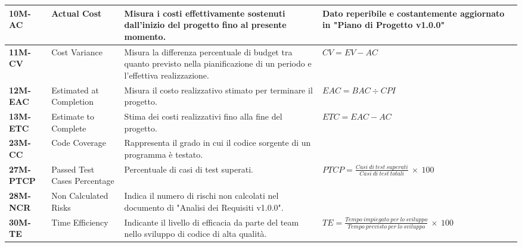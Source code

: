 \begin{longtable}{|>{\centering\arraybackslash}p{}|>{\centering\arraybackslash}p{}|>{\centering\arraybackslash}p{}|>{\centering\arraybackslash}p{}|}
	\hline
	\textbf{10M-AC}   & Actual Cost                  & Misura i costi effettivamente sostenuti dall'inizio del progetto fino al presente momento.                                     & Dato reperibile e costantemente aggiornato in "Piano di Progetto v1.0.0"                                      \\
	\hline
	\textbf{11M-CV}   & Cost Variance                & Misura la differenza percentuale di budget tra quanto previsto nella pianificazione di un periodo e l'effettiva realizzazione. & $CV = EV - AC$                                                                                                \\
	\hline
	\textbf{12M-EAC}  & Estimated at Completion      & Misura il costo realizzativo stimato per terminare il progetto.                                                                & $EAC = BAC \div CPI$                                                                                          \\
	\hline
	\textbf{13M-ETC}  & Estimate to Complete         & Stima dei costi realizzativi fino alla fine del progetto.                                                                      & $ETC = EAC - AC$                                                                                              \\
	\hline
	\textbf{23M-CC}   & Code Coverage                & Rappresenta il grado in cui il codice sorgente di un programma è testato.                                                      &                                                                                                               \\
	\hline
	\textbf{27M-PTCP} & Passed Test Cases Percentage & Percentuale di casi di test superati.                                                                                          & $PTCP = \frac{Casi\: di\: test\: superati}{Casi\: di\: test\: totali}\: \times \: 100$                        \\
	\hline
	\textbf{28M-NCR}  & Non Calculated Risks         & Indica il numero di rischi non calcolati nel documento di "Analisi dei Requisiti v1.0.0".                                      &                                                                                                               \\
	\hline
	\textbf{30M-TE}   & Time Efficiency              & Indicante il livello di efficacia da parte del team nello sviluppo di codice di alta qualità.                                  & $TE = \frac{Tempo\: impiegato\: per\: lo\: sviluppo}{Tempo\: previsto\: per\: lo\: sviluppo}\: \times \: 100$ \\

\end{longtable}
